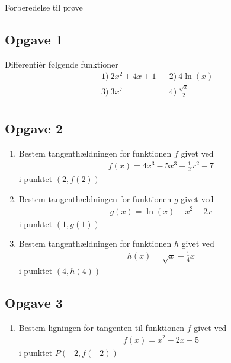 \begin{center}
\Huge
Forberedelse til prøve
\end{center}

\subsection*{Opgave 1}
Differentiér følgende funktioner
\begin{align*}
	&1) \ 2x^2+4x+1    &&2) \ 4\ln(x)    \\
	&3) \  3x^7   &&4) \ \frac{\sqrt{x}}{2}    \\
\end{align*}
\subsection*{Opgave 2}
\begin{enumerate}[label=\roman*)]
	\item Bestem tangenthældningen for funktionen $f$ givet ved
	\begin{align*}
		f(x) = 4x^3-5x^3+\frac{1}{2}x^2 - 7
	\end{align*} 
	i punktet $(2,f(2))$
	\item Bestem tangenthældningen for funktionen $g$ givet ved
	\begin{align*}
		g(x) = \ln(x) - x^2 -2x 
	\end{align*} 
	i punktet $(1,g(1))$
	\item Bestem tangenthældningen for funktionen $h$ givet ved
	\begin{align*}
		h(x) = \sqrt{x} -\frac{1}{4}x
	\end{align*} 
	i punktet $(4,h(4))$
\end{enumerate}

\subsection*{Opgave 3}

\begin{enumerate}[label=\roman*)]
	\item Bestem ligningen for tangenten til funktionen $f$ givet ved
	\begin{align*}
		f(x) = x^2-2x+5
	\end{align*}
	i punktet $P(-2,f(-2))$
\end{enumerate}

